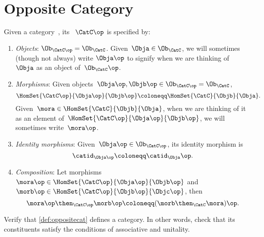 

\section{Opposite Category}


\begin{ctdefinition}
    \label{def:opposite-category}
    \label{def:oppositecat}
    Given a category~\CatC, its \emph{}~$\CatC\op$ is specified by:
    \begin{enumerate}
        \item \emph{Objects}: $\Ob_{\CatC\op} = \Ob_\CatC$. Given~$\Obja \in  \Ob_\CatC$, we will sometimes (though not always) write $\Obja\op$ to signify when we are thinking of~$\Obja$ as an object of~$\Ob_\CatC\op$.
        
        \item \emph{Morphisms}: Given objects~$\Obja\op,  \Objb\op \in \Ob_{\CatC\op} = \Ob_\CatC$,
        \begin{equation}
            \label{eq:homset-op-cat}
            \HomSet{\CatC\op}{\Obja\op}{\Objb\op} \coloneqq \HomSet{\CatC}{\Objb}{\Obja}.
        \end{equation}
        Given~$\mora \in \HomSet{\CatC}{\Objb}{\Obja}$, when we are thinking of it as an element of~$\HomSet{\CatC\op}{\Obja\op}{\Objb\op}$, we will sometimes write~$\mora\op$.
        \item \emph{Identity morphisms}: Given~$\Obja\op \in \Ob_{\CatC\op}$, its identity morphism is
        \begin{equation}
            \catid_{\Obja\op} \coloneqq \catid_{\Obja}\op.
        \end{equation}
        \item \emph{Composition}: Let morphisms~$\mora\op \in \HomSet{\CatC\op}{\Obja\op}{\Objb\op}$ and~$\morb\op \in \HomSet{\CatC\op}{\Objb\op}{\Objc\op}$, then
        \begin{equation}
            \mora\op \then_{\CatC\op} \morb\op \coloneqq (\morb \then_\CatC \mora)\op.
        \end{equation}
    \end{enumerate}
\end{ctdefinition}

\begin{gradedexercise}
    \label{ex:OppositeCat}
    Verify that \cref{def:oppositecat} defines a category.
    In other words, check that its constituents satisfy the conditions of associative and unitality.
\end{gradedexercise}

